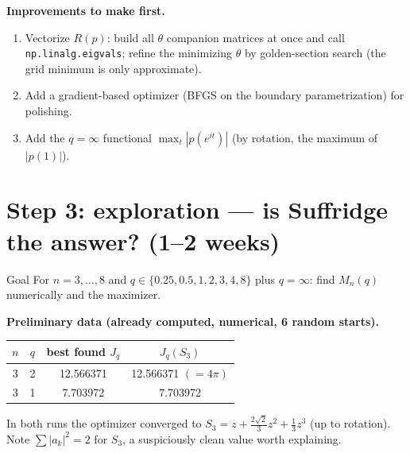 \documentclass[11pt]{article}
\begin{document}
\textbf{Improvements to make first.}
\begin{enumerate}[nosep]
\item Vectorize $R(p)$: build all $\theta$ companion matrices at once and call \texttt{np.linalg.eigvals}; refine the minimizing $\theta$ by golden-section search (the grid minimum is only approximate).
\item Add a gradient-based optimizer (BFGS on the boundary parametrization) for polishing.
\item Add the $q=\infty$ functional $\max_t|p(e^{it})|$ (by rotation, the maximum of $|p(1)|$).
\end{enumerate}

\section{Step 3: exploration --- is Suffridge the answer? (1--2 weeks)}

\begin{goal}{Goal}
For $n=3,\dots,8$ and $q\in\{0.25,0.5,1,2,3,4,8\}$ plus $q=\infty$: find $M_n(q)$ numerically and the maximizer.
\end{goal}

\textbf{Preliminary data (already computed, numerical, 6 random starts).}
\begin{center}
\begin{tabular}{@{}cccc@{}}
\toprule
$n$ & $q$ & best found $J_q$ & $J_q(S_3)$ \\ \midrule
3 & 2 & 12.566371 & 12.566371 $(=4\pi)$ \\
3 & 1 & 7.703972 & 7.703972 \\ \bottomrule
\end{tabular}
\end{center}
In both runs the optimizer converged to $S_3=z+\tfrac{2\sqrt2}{3}z^2+\tfrac13z^3$ (up to rotation). Note $\sum|a_k|^2=2$ for $S_3$, a suspiciously clean value worth explaining.
\end{document}
